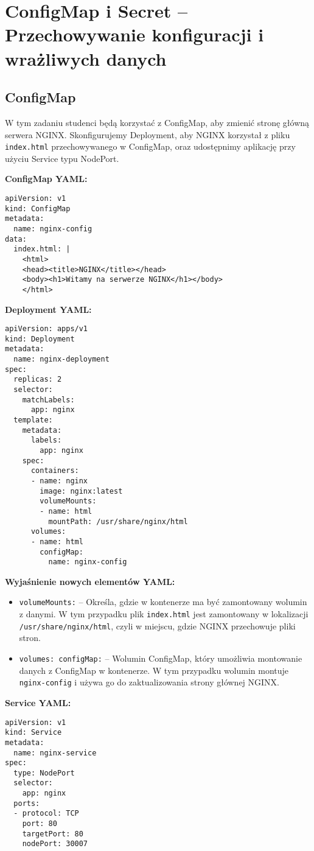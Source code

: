 \documentclass{article}
\begin{document}
\section{ConfigMap i Secret – Przechowywanie konfiguracji i wrażliwych danych}

\subsection{ConfigMap} 
W tym zadaniu studenci będą korzystać z ConfigMap, aby zmienić stronę główną serwera NGINX. Skonfigurujemy Deployment, aby NGINX korzystał z pliku \texttt{index.html} przechowywanego w ConfigMap, oraz udostępnimy aplikację przy użyciu Service typu NodePort.

\textbf{ConfigMap YAML:}
\begin{lstlisting}
apiVersion: v1
kind: ConfigMap
metadata:
  name: nginx-config
data:
  index.html: |
    <html>
    <head><title>NGINX</title></head>
    <body><h1>Witamy na serwerze NGINX</h1></body>
    </html>
\end{lstlisting}

\textbf{Deployment YAML:}
\begin{lstlisting}
apiVersion: apps/v1
kind: Deployment
metadata:
  name: nginx-deployment
spec:
  replicas: 2
  selector:
    matchLabels:
      app: nginx
  template:
    metadata:
      labels:
        app: nginx
    spec:
      containers:
      - name: nginx
        image: nginx:latest
        volumeMounts:
        - name: html
          mountPath: /usr/share/nginx/html
      volumes:
      - name: html
        configMap:
          name: nginx-config
\end{lstlisting}

\textbf{Wyjaśnienie nowych elementów YAML:}
\begin{itemize}
  \item \texttt{volumeMounts:} – Określa, gdzie w kontenerze ma być zamontowany wolumin z danymi. W tym przypadku plik \texttt{index.html} jest zamontowany w lokalizacji \texttt{/usr/share/nginx/html}, czyli w miejscu, gdzie NGINX przechowuje pliki stron.
  \item \texttt{volumes: configMap:} – Wolumin ConfigMap, który umożliwia montowanie danych z ConfigMap w kontenerze. W tym przypadku wolumin montuje \texttt{nginx-config} i używa go do zaktualizowania strony głównej NGINX.
\end{itemize}

\textbf{Service YAML:}
\begin{lstlisting}
apiVersion: v1
kind: Service
metadata:
  name: nginx-service
spec:
  type: NodePort
  selector:
    app: nginx
  ports:
  - protocol: TCP
    port: 80
    targetPort: 80
    nodePort: 30007
\end{lstlisting}
\end{document}
